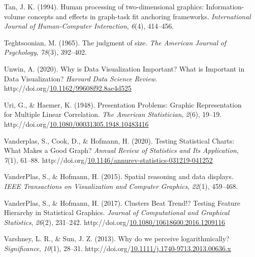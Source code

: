 \documentclass[print]{nuthesis}
\newlength{\cslhangindent}
\newenvironment{CSLReferences}%
{\setlength{\parindent}{0pt}%
\everypar{\setlength{\hangindent}{\cslhangindent}}\ignorespaces}%
{\par}
\begin{document}
\begin{CSLReferences}{1}{0}
\leavevmode\hypertarget{ref-tan1994human}{}%
Tan, J. K. (1994). Human processing of two-dimensional graphics: Information-volume concepts and effects in graph-task fit anchoring frameworks. \emph{International Journal of Human-Computer Interaction}, \emph{6}(4), 414--456.

\leavevmode\hypertarget{ref-teghtsoonian1965judgment}{}%
Teghtsoonian, M. (1965). The judgment of size. \emph{The American Journal of Psychology}, \emph{78}(3), 392--402.

\leavevmode\hypertarget{ref-unwin_why_2020}{}%
Unwin, A. (2020). Why is {Data} {Visualization} {Important}? {What} is {Important} in {Data} {Visualization}? \emph{Harvard Data Science Review}. http://doi.org/\href{https://doi.org/10.1162/99608f92.8ae4d525}{10.1162/99608f92.8ae4d525}

\leavevmode\hypertarget{ref-uri_presentation_1948}{}%
Uri, G., \& Haemer, K. (1948). Presentation {Problems}: {Graphic} {Representation} for {Multiple} {Linear} {Correlation}. \emph{The American Statistician}, \emph{2}(6), 19--19. http://doi.org/\href{https://doi.org/10.1080/00031305.1948.10483416}{10.1080/00031305.1948.10483416}

\leavevmode\hypertarget{ref-vanderplas_testing_2020}{}%
Vanderplas, S., Cook, D., \& Hofmann, H. (2020). Testing {Statistical} {Charts}: {What} {Makes} a {Good} {Graph}? \emph{Annual Review of Statistics and Its Application}, \emph{7}(1), 61--88. http://doi.org/\href{https://doi.org/10.1146/annurev-statistics-031219-041252}{10.1146/annurev-statistics-031219-041252}

\leavevmode\hypertarget{ref-vanderplas2015spatial}{}%
VanderPlas, S., \& Hofmann, H. (2015). Spatial reasoning and data displays. \emph{IEEE Transactions on Visualization and Computer Graphics}, \emph{22}(1), 459--468.

\leavevmode\hypertarget{ref-vanderplas_clusters_2017}{}%
VanderPlas, S., \& Hofmann, H. (2017). Clusters {Beat} {Trend}!? {Testing} {Feature} {Hierarchy} in {Statistical} {Graphics}. \emph{Journal of Computational and Graphical Statistics}, \emph{26}(2), 231--242. http://doi.org/\href{https://doi.org/10.1080/10618600.2016.1209116}{10.1080/10618600.2016.1209116}

\leavevmode\hypertarget{ref-varshney_why_2013}{}%
Varshney, L. R., \& Sun, J. Z. (2013). Why do we perceive logarithmically? \emph{Significance}, \emph{10}(1), 28--31. http://doi.org/\href{https://doi.org/10.1111/j.1740-9713.2013.00636.x}{10.1111/j.1740-9713.2013.00636.x}


\end{CSLReferences}
\end{document}

